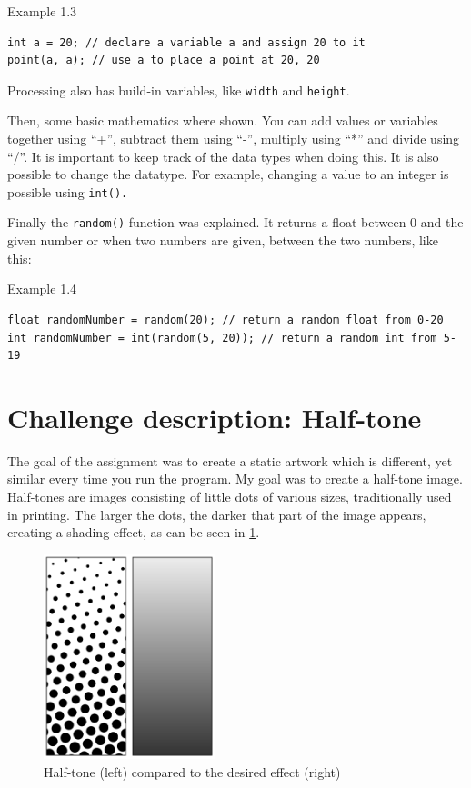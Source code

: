 \begin{codebox}{Example 1.3}
    \begin{lstlisting}
int a = 20; // declare a variable a and assign 20 to it
point(a, a); // use a to place a point at 20, 20
    \end{lstlisting}
\end{codebox}

Processing also has build-in variables, like \texttt{width} and \texttt{height}.

Then, some basic mathematics where shown. You can add values or variables together using ``+'', subtract them using ``-'', multiply using ``*'' and divide using ``/''. It is important to keep track of the data types when doing this. It is also possible to change the datatype. For example, changing a value to an integer is possible using \texttt{int().}

Finally the \texttt{random()} function was explained. It returns a float between 0 and the given number or when two numbers are given, between the two numbers, like this:

\begin{codebox}{Example 1.4}
    \begin{lstlisting}
float randomNumber = random(20); // return a random float from 0-20
int randomNumber = int(random(5, 20)); // return a random int from 5-19
    \end{lstlisting}
\end{codebox}

\section{Challenge description: Half-tone}

The goal of the assignment was to create a static artwork which is different, yet similar every time you run the program. My goal was to create a half-tone image. Half-tones are images consisting of little dots of various sizes, traditionally used in printing. The larger the dots, the darker that part of the image appears, creating a shading effect, as can be seen in \cref{fig: half-tone}.

\begin{figure}[H]
    \centering
    \includegraphics[width = 5cm]{Figures/day_1/half_tone.png}
    \caption{Half-tone (left) compared to the desired effect (right)}
    \label{fig: half-tone}
\end{figure}

